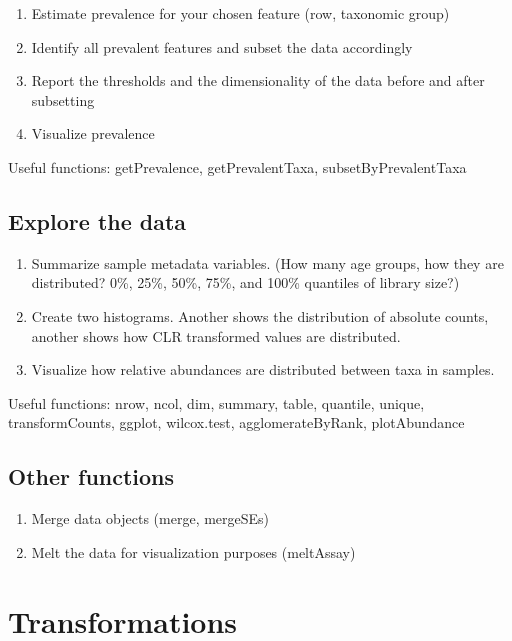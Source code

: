 \documentclass[
]{book}
\providecommand{\tightlist}{%
  \setlength{\itemsep}{0pt}\setlength{\parskip}{0pt}}
\begin{document}
\begin{enumerate}
\def\labelenumi{\arabic{enumi}.}
\tightlist
\item
  Estimate prevalence for your chosen feature (row, taxonomic group)
\item
  Identify all prevalent features and subset the data accordingly
\item
  Report the thresholds and the dimensionality of the data before and after subsetting
\item
  Visualize prevalence
\end{enumerate}

Useful functions: getPrevalence, getPrevalentTaxa, subsetByPrevalentTaxa

\hypertarget{explore-the-data}{%
\subsection{Explore the data}\label{explore-the-data}}

\begin{enumerate}
\def\labelenumi{\arabic{enumi}.}
\tightlist
\item
  Summarize sample metadata variables. (How many age groups, how they are distributed? 0\%, 25\%, 50\%, 75\%, and 100\% quantiles of library size?)
\item
  Create two histograms. Another shows the distribution of absolute counts, another shows how CLR transformed values are distributed.
\item
  Visualize how relative abundances are distributed between taxa in samples.
\end{enumerate}

Useful functions: nrow, ncol, dim, summary, table, quantile, unique, transformCounts, ggplot, wilcox.test, agglomerateByRank, plotAbundance

\hypertarget{other-functions}{%
\subsection{Other functions}\label{other-functions}}

\begin{enumerate}
\def\labelenumi{\arabic{enumi}.}
\tightlist
\item
  Merge data objects (merge, mergeSEs)
\item
  Melt the data for visualization purposes (meltAssay)
\end{enumerate}

\hypertarget{transformations}{%
\section{Transformations}\label{transformations}}
\end{document}
